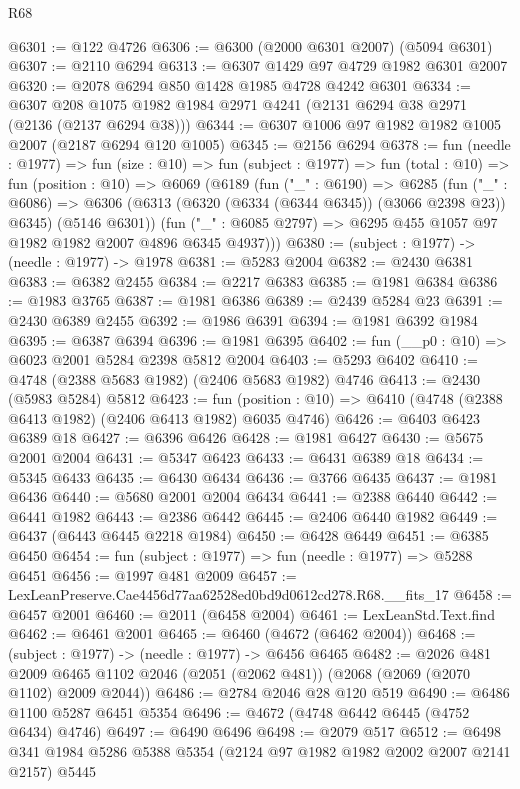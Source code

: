 \begin{lexlean}{R68}
\begin{coremodule}
@6301 := @122 @4726
@6306 := @6300 (@2000 @6301 @2007) (@5094 @6301)
@6307 := @2110 @6294
@6313 := @6307 @1429 @97 @4729 @1982 @6301 @2007
@6320 := @2078 @6294 @850 @1428 @1985 @4728 @4242 @6301
@6334 := @6307 @208 @1075 @1982 @1984 @2971 @4241 (@2131 @6294 @38 @2971 (@2136 (@2137 @6294 @38)))
@6344 := @6307 @1006 @97 @1982 @1982 @1005 @2007 (@2187 @6294 @120 @1005)
@6345 := @2156 @6294
@6378 := fun (needle : @1977) =>
  fun (size : @10) =>
  fun (subject : @1977) =>
  fun (total : @10) =>
  fun (position : @10) =>
  @6069
    (@6189
      (fun ("_" : @6190) =>
      @6285
        (fun ("_" : @6086) =>
        @6306 (@6313 (@6320 (@6334 (@6344 @6345)) (@3066 @2398 @23)) @6345) (@5146 @6301))
        (fun ("_" : @6085 @2797) => @6295 @455 @1057 @97 @1982 @1982 @2007 @4896 @6345 @4937)))
@6380 := (subject : @1977) -> (needle : @1977) -> @1978
@6381 := @5283 @2004
@6382 := @2430 @6381
@6383 := @6382 @2455
@6384 := @2217 @6383
@6385 := @1981 @6384
@6386 := @1983 @3765
@6387 := @1981 @6386
@6389 := @2439 @5284 @23
@6391 := @2430 @6389 @2455
@6392 := @1986 @6391
@6394 := @1981 @6392 @1984
@6395 := @6387 @6394
@6396 := @1981 @6395
@6402 := fun (__p0 : @10) => @6023 @2001 @5284 @2398 @5812 @2004
@6403 := @5293 @6402
@6410 := @4748 (@2388 @5683 @1982) (@2406 @5683 @1982) @4746
@6413 := @2430 (@5983 @5284) @5812
@6423 := fun (position : @10) => @6410 (@4748 (@2388 @6413 @1982) (@2406 @6413 @1982) @6035 @4746)
@6426 := @6403 @6423 @6389 @18
@6427 := @6396 @6426
@6428 := @1981 @6427
@6430 := @5675 @2001 @2004
@6431 := @5347 @6423
@6433 := @6431 @6389 @18
@6434 := @5345 @6433
@6435 := @6430 @6434
@6436 := @3766 @6435
@6437 := @1981 @6436
@6440 := @5680 @2001 @2004 @6434
@6441 := @2388 @6440
@6442 := @6441 @1982
@6443 := @2386 @6442
@6445 := @2406 @6440 @1982
@6449 := @6437 (@6443 @6445 @2218 @1984)
@6450 := @6428 @6449
@6451 := @6385 @6450
@6454 := fun (subject : @1977) => fun (needle : @1977) => @5288 @6451
@6456 := @1997 @481 @2009
@6457 := LexLeanPreserve.Cae4456d77aa62528ed0bd9d0612cd278.R68.__fits_17
@6458 := @6457 @2001
@6460 := @2011 (@6458 @2004)
@6461 := LexLeanStd.Text.find
@6462 := @6461 @2001
@6465 := @6460 (@4672 (@6462 @2004))
@6468 := (subject : @1977) -> (needle : @1977) -> @6456 @6465
@6482 := @2026
    @481
    @2009
    @6465
    @1102
    @2046
    (@2051 (@2062 @481))
    (@2068 (@2069 (@2070 @1102) @2009 @2044))
@6486 := @2784 @2046 @28 @120 @519
@6490 := @6486 @1100 @5287 @6451 @5354
@6496 := @4672 (@4748 @6442 @6445 (@4752 @6434) @4746)
@6497 := @6490 @6496
@6498 := @2079 @517
@6512 := @6498 @341 @1984 @5286 @5388 @5354 (@2124 @97 @1982 @1982 @2002 @2007 @2141 @2157) @5445

\end{coremodule}
\end{lexlean}

